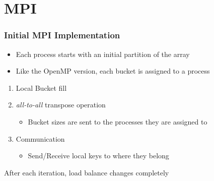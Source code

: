 \section{MPI}

\begin{frame}
	\frametitle{Initial MPI Implementation}

	\begin{itemize}
		\item[] Each process starts with an initial partition of the array

		\item[] Like the OpenMP version, each bucket is assigned to a process
	\end{itemize}


	\begin{enumerate}\itemsep=15pt
		\item Local Bucket fill

		\item \emph{all-to-all} transpose operation
		\begin{itemize}
			\item Bucket sizes are sent to the processes they are assigned to
		\end{itemize}

		\item Communication
		\begin{itemize}
			\item Send/Receive local keys to where they belong
		\end{itemize}

	\end{enumerate}

	After each iteration, load balance changes completely
\end{frame}
